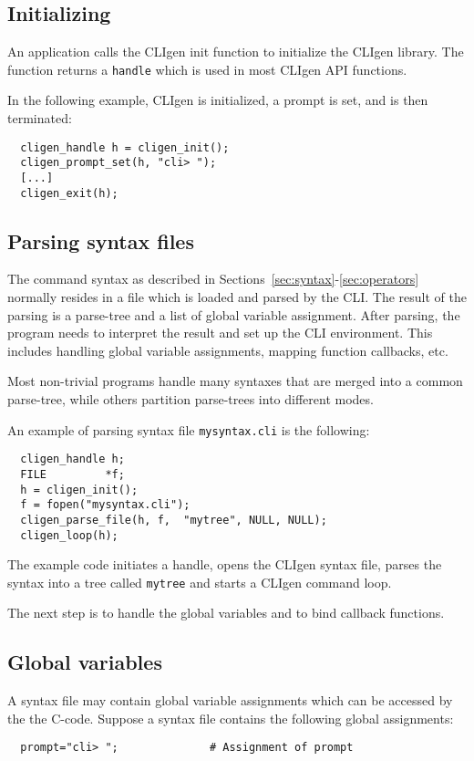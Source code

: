 \documentclass[a4paper, 10pt] {article}
\begin{document}
\subsection{Initializing}
\label{sec:handle}

An application calls the CLIgen init function to initialize the CLIgen
library.  The function returns a {\tt handle} which is used in most
CLIgen API functions.

In the following example, CLIgen is initialized, a prompt is set, and
is then terminated:
\begin{verbatim}
  cligen_handle h = cligen_init();
  cligen_prompt_set(h, "cli> ");
  [...]
  cligen_exit(h);
\end{verbatim}

\subsection{Parsing syntax files}
\label{sec:parsing}
The command syntax as described in
Sections~\ref{sec:syntax}-\ref{sec:operators} normally resides in a
file which is loaded and parsed by the CLI. The result of the parsing
is a parse-tree and a list of global variable assignment. After
parsing, the program needs to interpret the result and set up the CLI
environment. This includes handling global variable assignments,
mapping function callbacks, etc. 

Most non-trivial programs handle many syntaxes that are merged into a
common parse-tree, while others partition parse-trees into different
modes.

An example of parsing syntax file {\tt mysyntax.cli} is the following: 
\begin{verbatim}
  cligen_handle h;
  FILE         *f;
  h = cligen_init();
  f = fopen("mysyntax.cli");
  cligen_parse_file(h, f,  "mytree", NULL, NULL);
  cligen_loop(h);
\end{verbatim}

The example code initiates a handle, opens the CLIgen syntax file, parses the
syntax into a tree called {\tt mytree} and starts a CLIgen command loop.

The next step is to handle the global variables and to bind callback
functions.

\subsection{Global variables}
\label{sec:global}

A syntax file may contain global variable assignments which can be
accessed by the the C-code. Suppose a syntax file contains the following global assignments:
\begin{verbatim}
  prompt="cli> ";              # Assignment of prompt
\end{verbatim}
\end{document}
